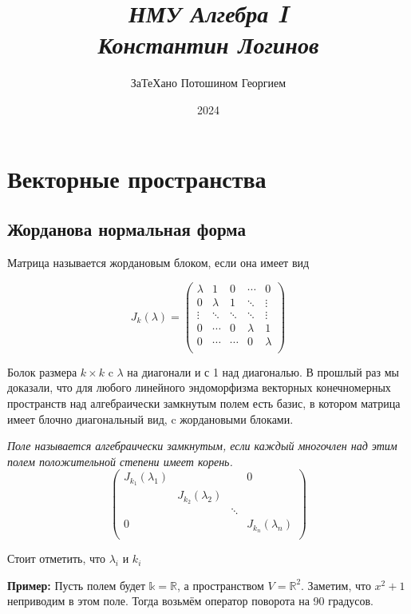 \documentclass[a4paper, 12pt]{book}
\title{
\textit{\huge{НМУ Алгебра I\\Константин Логинов}}
}
\date{2024}
\author{\small{ЗаТеХано Потошином Георгием}}
\begin{document}
\maketitle
\chapter{Векторные пространства}
\section{Жорданова нормальная форма}
Матрица называется жордановым блоком, если она имеет вид

\[J_k(\lambda)=\left(\begin{array}{ccccc}
    \lambda & 1       & 0      & \cdots  & 0\\
    0       & \lambda & 1      & \ddots  & \vdots\\
    \vdots  & \ddots  & \ddots & \ddots  & \vdots\\
    0       & \cdots  & 0      & \lambda & 1\\
    0       & \cdots  & \cdots & 0       & \lambda\\
\end{array}\right)\]

Болок размера $k\times k$ c $\lambda$ на диагонали и с 1 над диагональю. В
прошлый раз мы доказали, что для любого линейного эндоморфизма векторных
конечномерных пространств над алгебраически замкнутым полем есть базис, в
котором матрица имеет блочно диагональный вид, c жордановыми блоками.

\textit{Поле называется алгебраически замкнутым, если каждый многочлен над этим
полем положительной степени имеет корень.}
\[
    \left(\begin{array}{cccc}
        J_{k_1}(\lambda_1) &                    &        & 0\\
                           & J_{k_2}(\lambda_2) &        & \\
                           &                    & \ddots & \\
        0                  &                    &        & J_{k_n}(\lambda_n)\\
    \end{array}\right)
\]

Стоит отметить, что $\lambda_i$ и $k_i$

\textbf{Пример:} Пусть полем будет $\mathbb{k}=\mathbb{R}$, а пространством
$V=\mathbb{R}^2$. Заметим, что $x^2+1$ неприводим в этом поле. Тогда возьмём
оператор поворота на 90 градусов.
\end{document}
